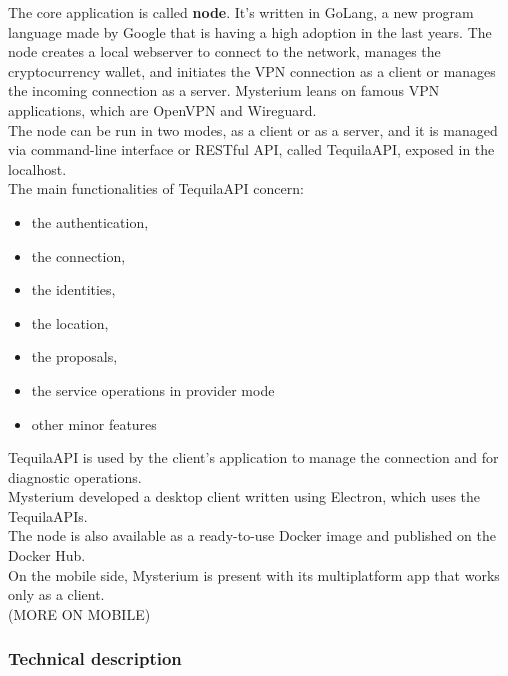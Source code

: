 \documentclass[12pt]{article}
\begin{document}
	The core application is called \textbf{node}. It's written in GoLang, a new program language made by Google that is having a high adoption in the last years. The node creates a local webserver to connect to the network, manages the cryptocurrency wallet, and initiates the VPN connection as a client or manages the incoming connection as a server. Mysterium leans on famous VPN applications, which are OpenVPN and Wireguard.\\
	The node can be run in two modes, as a client or as a server, and it is managed via command-line interface or RESTful API, called TequilaAPI, exposed in the localhost.\\
	\bigbreak
	The main functionalities of TequilaAPI concern:
	\begin{itemize}
		\item the authentication,
		\item the connection,
		\item the identities,
		\item the location,
		\item the proposals,
		\item the service operations in provider mode
		\item other minor features
	\end{itemize}
	\bigbreak

	TequilaAPI is used by the client's application to manage the connection and for diagnostic operations.\\
	Mysterium developed a desktop client written using Electron, which uses the TequilaAPIs.\\
	The node is also available as a ready-to-use Docker image and published on the Docker Hub.\\
	On the mobile side, Mysterium is present with its multiplatform app that works only as a client.\\
	
	\bigbreak
	(MORE ON MOBILE)

	\subsubsection{Technical description}
\end{document}
